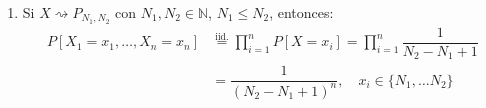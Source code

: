 \begin{ejercicio}
\begin{enumerate}[label=\alph*)]
\begin{align*}
                f(x_1, \ldots, x_n) &\stackrel{\text{iid.}}{=} \prod_{i=1}^{n}f(x_i) = \prod_{i=1}^{n} \dfrac{1}{\beta(p,q)} x_i^{p-1} {(1-x_i)}^{q-1} \\
                &= \dfrac{1}{{\beta(p,q)}^{n}} {\left(\prod_{i=1}^{n}x_i\right)}^{p-1} {\left(\prod_{i=1}^{n}(1-x_i)\right)}^{q-1} \quad x_i \in [0,1], \forall i \in \{1,\ldots,n\}
            \end{align*}
            \begin{itemize}
                \item Si $p$ es conocida, tomamos:
                    \begin{gather*}
                        h(x_1, \ldots, x_n) = {\left(\prod_{i=1}^{n}x_i\right)}^{p-1}, \qquad T(X_1, \ldots, X_n) = \prod_{i=1}^{n}(1-X_i) \\
                        g_q(t) = \dfrac{1}{{\beta(p,q)}^{n}} t^{q-1}
                    \end{gather*}
                \item Si $q$ es conocida:
                    \begin{gather*}
                        h(x_1, \ldots, x_n) = {\left(\prod_{i=1}^{n}(1-x_i)\right)}^{q-1}, \qquad T(X_1, \ldots, X_n) = \prod_{i=1}^{n}X_i \\
                        g_p(t) = \dfrac{1}{{\beta(p,q)}^{n}} t^{p-1}
                    \end{gather*}
                \item Si tanto $p$ como $q$ son parámetros:
                    \begin{gather*}
                        h(x_1, \ldots, x_n) = 1, \qquad T(X_1, \ldots, X_n) = \left(\prod_{i=1}^{n}X_i, \prod_{i=1}^{n}(1-X_i)\right) \\
                        g_{(p,q)}(t_1, t_2) = \dfrac{1}{{\beta(p,q)}^{n}}t_1^{p-1}t_2^{q-1}
                    \end{gather*}
            \end{itemize}
        \item Si $X\rightsquigarrow P_{N_1,N_2}$ con $N_1,N_2\in \mathbb{N}$, $N_1\leq N_2$, entonces:
            \begin{align*}
                P[X_1=x_1, \ldots, X_n=x_n]&\stackrel{\text{iid.}}{=} \prod_{i=1}^{n} P[X=x_i] =\prod_{i=1}^{n} \dfrac{1}{N_2-N_1+1} \\
                                           &= \dfrac{1}{{(N_2-N_1+1)}^{n}}, \quad x_i \in \{N_1, \ldots N_2\} 
            \end{align*}

\end{enumerate}
\end{ejercicio}
